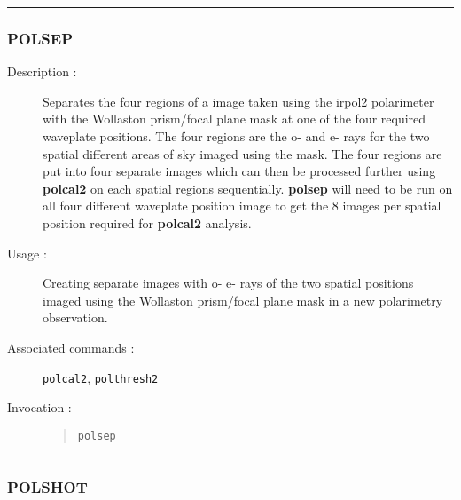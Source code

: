 \hrule
\subsubsection*{\label{POLSEP}POLSEP}

\begin{description}

\item[Description :] Separates the four regions of a image taken using
the {\sc irpol2} polarimeter with the Wollaston prism/focal plane mask at one
of the four required waveplate positions.  The four regions are the o-
and e- rays for the two spatial different areas of sky imaged using the
mask.  The four regions are put into four separate images which can
then be processed further using {\bf polcal2} on each spatial regions
sequentially. {\bf polsep} will need to be run on all four different
waveplate position image to get the 8 images per spatial position
required for {\bf polcal2} analysis.

\item[Usage :] Creating separate images with o- e- rays of the two
spatial positions imaged using the Wollaston prism/focal plane mask in
a new polarimetry observation.

\item[Associated commands :] {\tt {}}
{\tt polcal2}, {\tt polthresh2}

\item[Invocation :]

\begin{quote}{\tt  polsep }\end{quote}

\end{description}

\hrule
\subsubsection*{\label{POLSHOT}POLSHOT}

